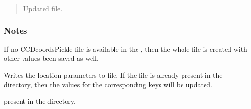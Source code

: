 \documentclass[letterpaper,10pt,english]{sphinxmanual}
\begin{document}
\begin{fulllineitems}
\begin{fulllineitems}
\begin{quote}
\begin{description}
\sphinxAtStartPar
Updated  file.

\end{description}\end{quote}
\subsubsection*{Notes}

\sphinxAtStartPar
If no CCDcoordsPickle file is available in the , then the whole
file is created with other values been saved as well.

\end{fulllineitems}


\begin{fulllineitems}
\label{\detokenize{xmmPipeline:xmmPipeline.epicObj.epicObj.writeCCDcoordsPickle}}
\pysigstartsignatures
{}
\pysigstopsignatures
\sphinxAtStartPar
Writes the location parameters to  file.
If the file is already present in the directory, then the values for the
corresponding keys will be updated.
\begin{description}
\sphinxAtStartPar
present in the directory.

\end{description}

\end{fulllineitems}


\end{fulllineitems}


\begin{fulllineitems}
\label{\detokenize{xmmPipeline:xmmPipeline.epicObj.printErrorMessage}}
\pysigstartsignatures
{}
\pysigstopsignatures
\end{fulllineitems}
\end{document}
